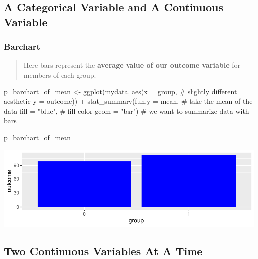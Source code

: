 \documentclass[12pt,]{article}
\newenvironment{Shaded}{}{}
\newcommand{\CommentTok}[1]{\textcolor[rgb]{0.00,0.50,0.00}{#1}}
\newcommand{\DataTypeTok}[1]{#1}
\newcommand{\KeywordTok}[1]{\textcolor[rgb]{0.00,0.00,1.00}{#1}}
\newcommand{\NormalTok}[1]{#1}
\newcommand{\OperatorTok}[1]{#1}
\newcommand{\StringTok}[1]{\textcolor[rgb]{0.00,0.50,0.50}{#1}}
\begin{document}
\hypertarget{a-categorical-variable-and-a-continuous-variable}{%
\subsection{A Categorical Variable and A Continuous
Variable}\label{a-categorical-variable-and-a-continuous-variable}}

\hypertarget{barchart}{%
\subsubsection{Barchart}\label{barchart}}

\begin{quote}
Here bars represent the \textbf{average value of our outcome variable}
for members of each group.
\end{quote}

\begin{Shaded}
\begin{Highlighting}[]
\NormalTok{p_barchart_of_mean <-}\StringTok{ }\KeywordTok{ggplot}\NormalTok{(mydata, }
                             \KeywordTok{aes}\NormalTok{(}\DataTypeTok{x =}\NormalTok{ group, }\CommentTok{# slightly different aesthetic}
                                 \DataTypeTok{y =}\NormalTok{ outcome)) }\OperatorTok{+}\StringTok{ }
\StringTok{  }\KeywordTok{stat_summary}\NormalTok{(}\DataTypeTok{fun.y =}\NormalTok{ mean, }\CommentTok{# take the mean of the data}
               \DataTypeTok{fill =} \StringTok{"blue"}\NormalTok{, }\CommentTok{# fill color}
               \DataTypeTok{geom =} \StringTok{"bar"}\NormalTok{) }\CommentTok{# we want to summarize data with bars}

\NormalTok{p_barchart_of_mean}
\end{Highlighting}
\end{Shaded}

\includegraphics{introduction-to-ggplot2_files/figure-latex/unnamed-chunk-15-1.pdf}

\hypertarget{two-continuous-variables-at-a-time}{%
\subsection{Two Continuous Variables At A
Time}\label{two-continuous-variables-at-a-time}}
\end{document}
